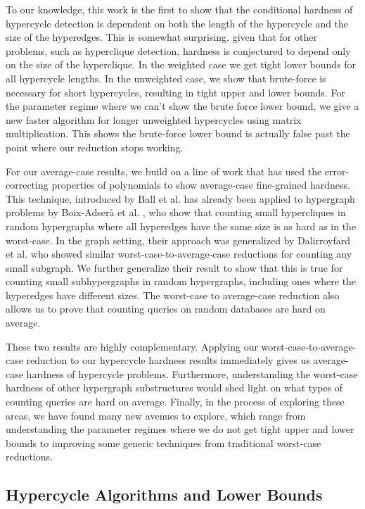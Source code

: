 \documentclass[11pt,letterpaper,pdftex]{article}
\begin{document}
To our knowledge, this work is the first to show that the conditional hardness of hypercycle detection is dependent on both the length of the hypercycle and the size of the hyperedges.
This is somewhat surprising, given that for other problems, such as hyperclique detection, hardness is conjectured to depend only on the size of the hyperclique.
In the weighted case we get tight lower bounds for all hypercycle lengths.
In the unweighted case, we show that brute-force is necessary for  short hypercycles, resulting in tight upper and lower bounds. 
For the parameter regime where we can't show the brute force lower bound, we give a new faster algorithm for longer unweighted hypercycles using matrix multiplication. 
This shows the brute-force lower bound is actually false past the point where our reduction stops working.

For our average-case results, we build on a line of work that has used the error-correcting properties of polynomials to show average-case fine-grained hardness.
This technique, introduced by Ball et al. \cite{BallWorstToAvg} has already been applied to hypergraph problems by Boix-Adser\`a et al. \cite{UniformCliqueABB}, who show that counting small hypercliques in random hypergraphs where all hyperedges have the same size is as hard as in the worst-case.
In the graph setting, their approach was generalized by Dalirroyfard et al.\cite{factoredProblems} who showed similar worst-case-to-average-case reductions for counting any small subgraph.
We further generalize their result to show that this is true for counting small subhypergraphs in random hypergraphs, including ones where the hyperedges have different sizes.
The worst-case to average-case reduction also allows us to prove that counting queries on random databases are hard on average.

These two results are highly complementary.
Applying our worst-case-to-average-case reduction to our hypercycle hardness results immediately gives us average-case hardness of hypercycle problems.
Furthermore, understanding the worst-case hardness of other hypergraph substructures would shed light on what types of counting queries are hard on average.
Finally, in the process of exploring these areas, we have found many new avenues to explore, which range from understanding the parameter regimes where we do not get tight upper and lower bounds to improving some generic techniques from traditional worst-case reductions.

\subsection{Hypercycle Algorithms and Lower Bounds}
\end{document}
